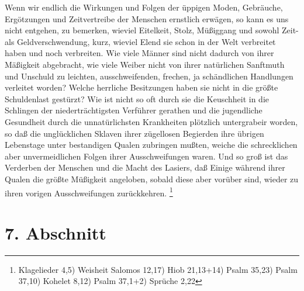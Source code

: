 \medskip

Wenn wir endlich die Wirkungen und Folgen der üppigen Moden, Gebräuche,
Ergötzungen und Zeitvertreibe der Menschen ernstlich erwägen, so kann es uns
nicht entgehen, zu bemerken, wieviel Eitelkeit, Stolz, Müßiggang und sowohl
Zeit- als Geldverschwendung, kurz, wieviel Elend sie schon in der Welt
verbreitet haben und noch verbreiten. Wie viele Männer sind nicht dadurch von
ihrer Mäßigkeit abgebracht, wie viele Weiber nicht von ihrer natürlichen
Sanftmuth und Unschuld zu leichten, ausschweifenden, frechen, ja schändlichen
Handlungen verleitet worden? Welche herrliche Besitzungen haben sie nicht in die
größte Schuldenlast gestürzt? Wie ist nicht so oft durch sie die Keuschheit in
die Schlingen der niederträchtigsten Verführer gerathen und die jugendliche
Gesundheit durch die unnatürlichsten Krankheiten plötzlich untergrabeir worden,
so daß die unglücklichen Sklaven ihrer zügellosen Begierden ihre
übrigen
Lebenstage unter bestandigen Qualen zubringen mußten, weiche die schrecklichen
aber unvermeidlichen Folgen ihrer Ausschweifungen waren. Und so groß ist das
Verderben der Menschen und die Macht des Lasiers, daß Einige während ihrer
Qualen die größte Müßigkeit angeloben, sobald diese aber vorüber sind, wieder zu
ihren vorigen Ausschweifungen zurückkehren.
\footnote{
Klagelieder 4,5)
Weisheit Salomos 12,17)
Hiob 21,13+14)
Psalm 35,23)
Psalm 37,10)
Kohelet 8,12)
Psalm 37,1+2)
Sprüche 2,22}

\section{7. Abschnitt} \label{kap18_ab7}

